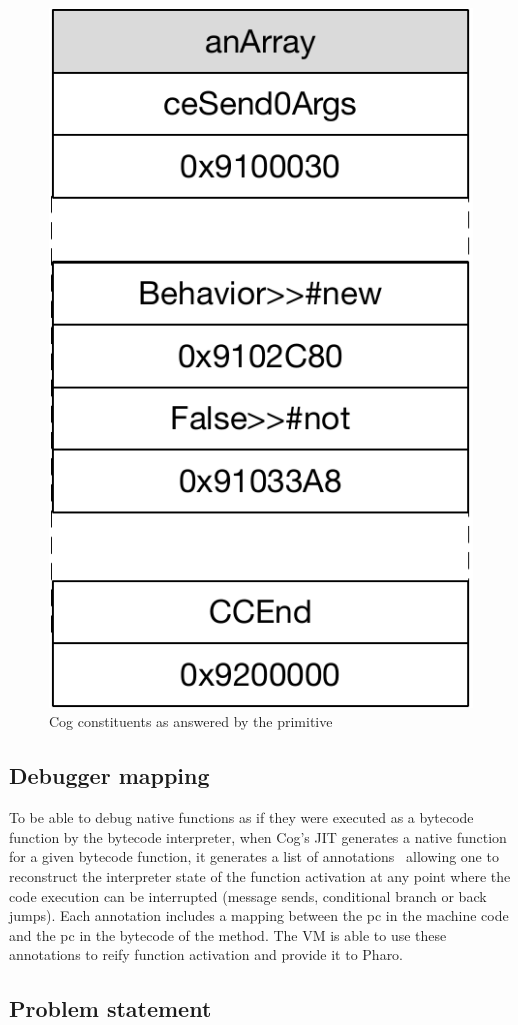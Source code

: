 \documentclass[10pt,preprint,nonatbib]{sigplanconf}
\newcommand{\figlabel}[1]{\label{fig:#1}}
\begin{document}
 \begin{figure}[!htp]
     \begin{center}
         \includegraphics[width=0.4\linewidth]{ContentsOfCollectCogCodePrim}
         \caption{Cog constituents as answered by the primitive}
         \figlabel{fig:ContentsOfCollectCogCodePrim}
     \end{center}
 \end{figure}

 
\subsection{Debugger mapping}

To be able to debug native functions as if they were executed as a bytecode function by the bytecode interpreter, when Cog's JIT generates a native function for a given bytecode function, it generates a list of annotations~\cite{Ber16d} allowing one to reconstruct the interpreter state of the function activation at any point where the code execution can be interrupted (message sends, conditional branch or back jumps). Each annotation includes a mapping between the pc in the machine code and the pc in the bytecode of the method. The VM is able to use these annotations to reify function activation and provide it to Pharo.
 
\subsection{Problem statement}
\end{document}
